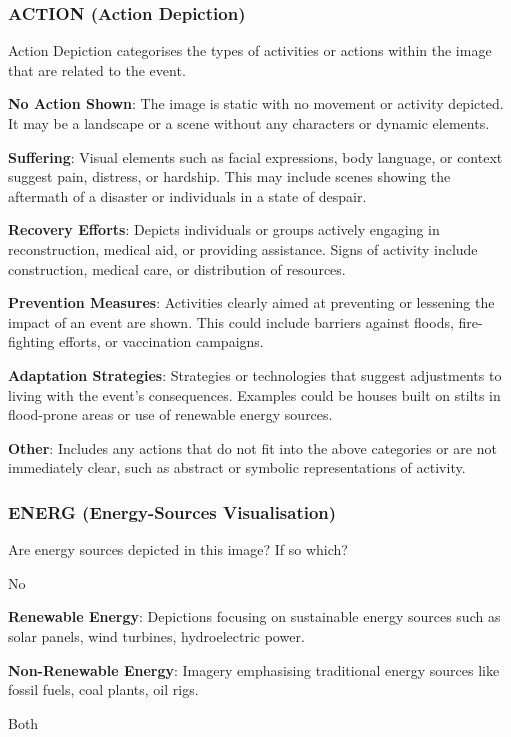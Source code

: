 \subsubsection*{ACTION (Action Depiction)}
\label{subsubsec:action-depiction}
Action Depiction categorises the types of activities or actions within the image that are related to the event.
\begin{description}[leftmargin=2.5cm, style=multiline, labelwidth=1.5cm]
\item[0] \textbf{No Action Shown}: The image is static with no movement or activity depicted. It may be a landscape or a scene without any characters or dynamic elements.
\item[1] \textbf{Suffering}: Visual elements such as facial expressions, body language, or context suggest pain, distress, or hardship. This may include scenes showing the aftermath of a disaster or individuals in a state of despair.
\item[2] \textbf{Recovery Efforts}: Depicts individuals or groups actively engaging in reconstruction, medical aid, or providing assistance. Signs of activity include construction, medical care, or distribution of resources.
\item[3] \textbf{Prevention Measures}: Activities clearly aimed at preventing or lessening the impact of an event are shown. This could include barriers against floods, fire-fighting efforts, or vaccination campaigns.
\item[4] \textbf{Adaptation Strategies}: Strategies or technologies that suggest adjustments to living with the event's consequences. Examples could be houses built on stilts in flood-prone areas or use of renewable energy sources.
\item[5] \textbf{Other}: Includes any actions that do not fit into the above categories or are not immediately clear, such as abstract or symbolic representations of activity.
\end{description}

\subsubsection*{ENERG (Energy-Sources Visualisation)}
\label{subsubsec:solution-visualisation}
Are energy sources depicted in this image? If so which?
\begin{description}[leftmargin=2.5cm, style=multiline, labelwidth=1.5cm]
\item[0] No
\item[1] \textbf{Renewable Energy}: Depictions focusing on sustainable energy sources such as solar panels, wind turbines, hydroelectric power.
\item[2] \textbf{Non-Renewable Energy}: Imagery emphasising traditional energy sources like fossil fuels, coal plants, oil rigs.
\item[3] Both
\end{description}

